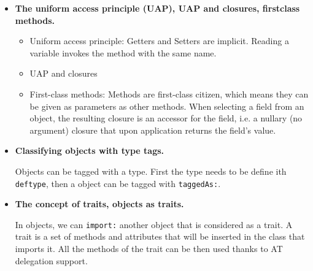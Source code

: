 \documentclass[a4paper]{report}
\begin{document}
\begin{itemize}
  \item \textbf{The uniform access principle (UAP), UAP and closures, firstclass methods.}

  \begin{itemize}
    \item Uniform access principle: Getters and Setters are implicit. Reading a variable invokes the method with the same name.
    \item UAP and closures \todo{}
    \item First-class methods: Methods are first-class citizen, which means they can be given as parameters as other methods. When selecting a field from an object, the resulting closure is an accessor for the field, i.e. a nullary (no argument) closure that upon application returns the field’s value.
  \end{itemize}
  \item \textbf{Classifying objects with type tags.}

  Objects can be tagged with a type. First the type needs to be define ith \texttt{deftype}, then a object can be tagged with \texttt{taggedAs:}.

  \item \textbf{The concept of traits, objects as traits.}

  In objects, we can \texttt{import:} another object that is considered as a trait. A trait is a set of methods and attributes that will be inserted in the class that imports it. All the methods of the trait can be then used thanks to AT delegation support.

\end{itemize}


\end{document}
